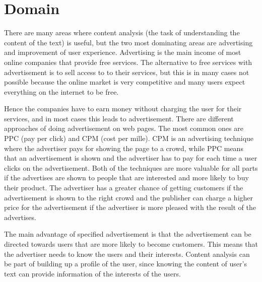 
\section{Domain}
There are many areas where content analysis (the task of understanding the content of the text) is useful, but the two most dominating areas are advertising and improvement of user experience. 
Advertising is the main income of most online companies that provide free services. The alternative to free services with advertisement is to sell access to to their services, but this is in many cases not possible because the online market is very competitive and many users expect everything on the internet to be free. 


Hence the companies have to earn money without charging the user for their services, and in most cases  this  leads to advertisement. There are different approaches of doing advertisement on web pages. The most common ones are PPC (pay per click) and CPM (cost per mille). CPM is an  advertising technique where the advertiser pays for showing the page to a crowd, while PPC means that an advertisement is shown and the advertiser has to pay for each time a user clicks on the advertisement. Both of the techniques are more valuable for all parts if the advertises are shown to people that are interested and more likely to buy their product. The advertiser has a greater chance of getting customers if the advertisement is shown to the right crowd and the publisher can charge a higher price for the advertisement if the advertiser is more pleased with the result of the advertises.

The main advantage of specified advertisement is that the advertisement can be directed towards users that are more likely to become customers. This means that the advertiser needs to know the users and their interests. Content analysis can be part of building up a profile of the user, since knowing the content of user's text can provide information of the interests of the users. 
